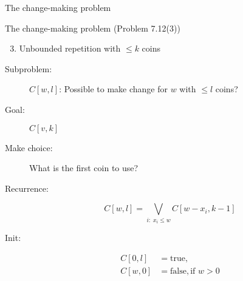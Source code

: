\begin{frame}{The change-making problem}
  \begin{exampleblock}{The change-making problem (Problem 7.12(3))}
	\begin{enumerate}[(1)]
	  \setcounter{enumi}{2}
	  \item Unbounded repetition with $\le k$ coins
	\end{enumerate}
  \end{exampleblock}

  \pause
  \begin{description}
	\item[Subproblem:] $C[w,l]$: Possible to make change for $w$ with $\le l$ coins?
	\item[Goal:] $C[v,k]$
	  \pause
	\item[Make choice:] What is the first coin to use?
	\item[Recurrence:] 
	  \[
		C[w,l] = \bigvee_{i: \; x_i \le w} C[w-x_i, k-1]
	  \]
	  \pause
	\item[Init:]
	  \begin{align*}
		C[0,l] &= \text{true}, \\
		C[w,0] &= \text{false}, \text{if } w > 0
	  \end{align*}
  \end{description}
\end{frame}
